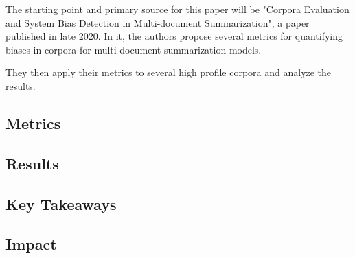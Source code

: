 \documentclass[../main.tex]{subfiles}
\begin{document}
The starting point and primary source for this paper will be
"Corpora Evaluation and System Bias Detection in Multi-document Summarization"\cite{dey-etal-2020-corpora}, a paper published in late 2020.
In it, the authors propose several metrics for quantifying biases in corpora for multi-document summarization models.

They then apply their metrics to several high profile corpora and analyze the results.

\subsection{Metrics}
\label{sec:metrics}


\subsection{Results}
\label{sec:results}


\subsection{Key Takeaways}
\label{sec:takewawys}


\subsection{Impact}
\label{sec:impact}

\end{document}
